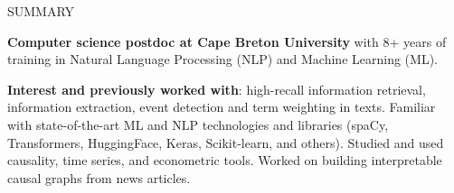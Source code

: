 \documentclass{resume} %
\begin{document}

\vspace{-0.2cm}
\begin{rSection}{SUMMARY}
\vspace{-0.1cm}
\item {\large \textbf{Computer science postdoc at Cape Breton University} with 8+ years of training in Natural Language Processing (NLP) and Machine Learning (ML).
\smallskip
 

 \textbf{Interest and previously worked with}: high-recall information retrieval, information extraction, event detection and term weighting in texts. Familiar with state-of-the-art ML and NLP technologies and libraries (spaCy, Transformers, HuggingFace, Keras, Scikit-learn, and others). Studied and used causality, time series, and econometric tools. Worked on building interpretable causal graphs from news articles. 
}


\end{rSection}
\end{document}
